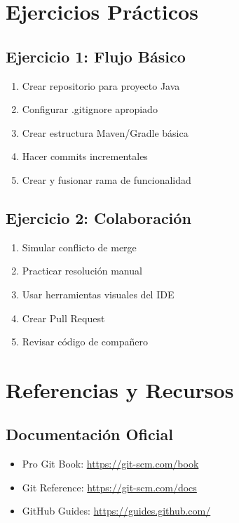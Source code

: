 \documentclass[12pt,a4paper]{article}
\begin{document}
\section{Ejercicios Prácticos}

\subsection{Ejercicio 1: Flujo Básico}
\begin{enumerate}
    \item Crear repositorio para proyecto Java
    \item Configurar .gitignore apropiado
    \item Crear estructura Maven/Gradle básica
    \item Hacer commits incrementales
    \item Crear y fusionar rama de funcionalidad
\end{enumerate}

\subsection{Ejercicio 2: Colaboración}
\begin{enumerate}
    \item Simular conflicto de merge
    \item Practicar resolución manual
    \item Usar herramientas visuales del IDE
    \item Crear Pull Request
    \item Revisar código de compañero
\end{enumerate}

\section{Referencias y Recursos}

\subsection{Documentación Oficial}
\begin{itemize}
    \item Pro Git Book: \url{https://git-scm.com/book}
    \item Git Reference: \url{https://git-scm.com/docs}
    \item GitHub Guides: \url{https://guides.github.com/}
\end{itemize}
\end{document}
